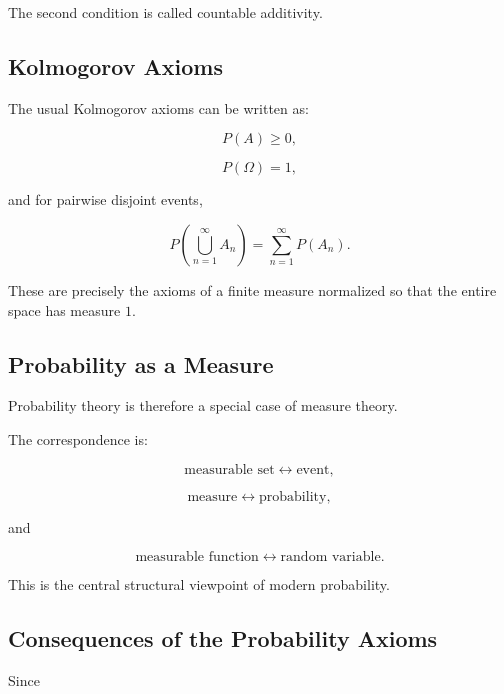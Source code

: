 The second condition is called countable additivity.

\subsection{Kolmogorov Axioms}
\label{subsec:kolmogorov-axioms-measure}

The usual Kolmogorov axioms can be written as:

\[
\boxed{
P(A)\geq0,
}
\]

\[
\boxed{
P(\Omega)=1,
}
\]

and for pairwise disjoint events,

\[
\boxed{
P
\left(
\bigcup_{n=1}^{\infty}A_n
\right)
=
\sum_{n=1}^{\infty}P(A_n).
}
\]

These are precisely the axioms of a finite measure normalized so that
the entire space has measure \(1\).

\subsection{Probability as a Measure}
\label{subsec:probability-as-measure}

Probability theory is therefore a special case of measure theory.

The correspondence is:

\[
\boxed{
\text{measurable set}
\longleftrightarrow
\text{event},
}
\]

\[
\boxed{
\text{measure}
\longleftrightarrow
\text{probability},
}
\]

and

\[
\boxed{
\text{measurable function}
\longleftrightarrow
\text{random variable}.
}
\]

This is the central structural viewpoint of modern probability.

\subsection{Consequences of the Probability Axioms}
\label{subsec:probability-measure-consequences}

Since

